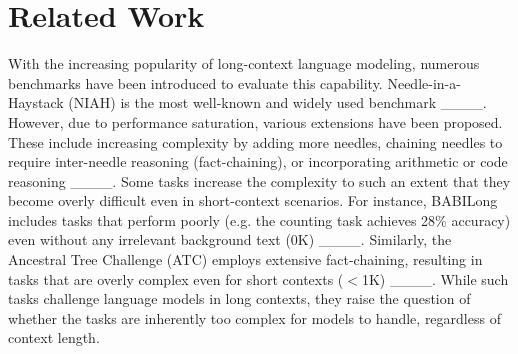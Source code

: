 \section{Related Work}



With the increasing popularity of long-context language modeling, numerous benchmarks have been introduced to evaluate this capability. Needle-in-a-Haystack (NIAH) is the most well-known and widely used benchmark ____. However, due to performance saturation, various extensions have been proposed. These include increasing complexity by adding more needles, chaining needles to require inter-needle reasoning (fact-chaining), or incorporating arithmetic or code reasoning ____.
Some tasks increase the complexity to such an extent that they become overly difficult even in short-context scenarios. For instance, BABILong includes tasks that perform poorly (e.g. the counting task achieves 28\% accuracy) even without any irrelevant background text (0K) ____. Similarly, the Ancestral Tree Challenge (ATC) employs extensive fact-chaining, resulting in tasks that are overly complex even for short contexts ($<$1K) ____.
While such tasks challenge language models in long contexts, they raise the question of whether the tasks are inherently too complex for models to handle, regardless of context length.

